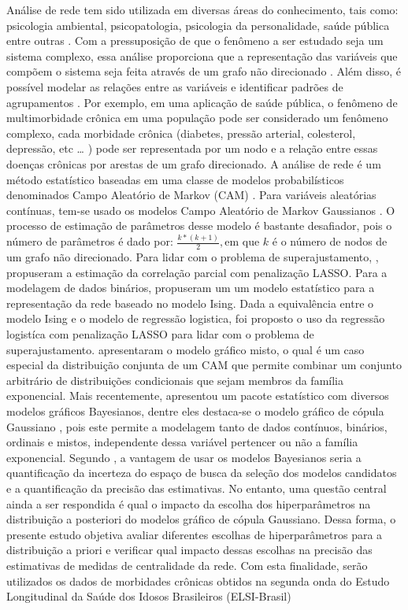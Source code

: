 \documentclass[
  super,
  preprint,
  3p]{elsarticle}
\begin{document}
Análise de rede tem sido utilizada em diversas áreas do conhecimento,
tais como: psicologia ambiental, psicopatologia, psicologia da
personalidade, saúde pública entre outras \citep[
]{ZWICKER2020101433, Borsboom2017, COSTANTINI201513, Soares2022}. Com a
pressuposição de que o fenômeno a ser estudado seja um sistema complexo,
essa análise proporciona que a representação das variáveis que compõem o
sistema seja feita através de um grafo não direcionado
\citep{Murphy2012}. Além disso, é possível modelar as relações entre as
variáveis e identificar padrões de agrupamentos \citep{Epskamp2022}. Por
exemplo, em uma aplicação de saúde pública, o fenômeno de multimorbidade
crônica em uma população pode ser considerado um fenômeno complexo, cada
morbidade crônica (diabetes, pressão arterial, colesterol, depressão,
etc \ldots{} ) pode ser representada por um nodo e a relação entre essas
doenças crônicas por arestas de um grafo direcionado. A análise de rede
é um método estatístico baseadas em uma classe de modelos
probabilísticos denominados Campo Aleatório de Markov (CAM)
\citep{Murphy2012}. Para variáveis aleatórias contínuas, tem-se usado os
modelos Campo Aleatório de Markov Gaussianos \citep{Rue2005}. O processo
de estimação de parâmetros desse modelo é bastante desafiador, pois o
número de parâmetros é dado por: \(\frac{k*(k+1)}{2},\)em que \(k\) é o
número de nodos de um grafo não direcionado. Para lidar com o problema
de superajustamento, \citet{Epskamp2018b}, propuseram a estimação da
correlação parcial com penalização LASSO. Para a modelagem de dados
binários, \citet{vanBorkulo2014} propuseram um um modelo estatístico
para a representação da rede baseado no modelo Ising. Dada a
equivalência entre o modelo Ising e o modelo de regressão logistica, foi
proposto o uso da regressão logistíca com penalização LASSO
\citep{Friedman2010} para lidar com o problema de superajustamento.
\citet{JSSv093i08} apresentaram o modelo gráfico misto, o qual é um caso
especial da distribuição conjunta de um CAM que permite combinar um
conjunto arbitrário de distribuições condicionais que sejam membros da
família exponencial. Mais recentemente, \citet{Huth} apresentou um
pacote estatístico com diversos modelos gráficos Bayesianos, dentre eles
destaca-se o modelo gráfico de cópula Gaussiano \citep{JSSv089i03}, pois
este permite a modelagem tanto de dados contínuos, binários, ordinais e
mistos, independente dessa variável pertencer ou não a família
exponencial. Segundo \citet{Huth}, a vantagem de usar os modelos
Bayesianos seria a quantificação da incerteza do espaço de busca da
seleção dos modelos candidatos e a quantificação da precisão das
estimativas. No entanto, uma questão central ainda a ser respondida é
qual o impacto da escolha dos hiperparâmetros na distribuição a
posteriori do modelos gráfico de cópula Gaussiano. Dessa forma, o
presente estudo objetiva avaliar diferentes escolhas de hiperparâmetros
para a distribuição a priori e verificar qual impacto dessas escolhas na
precisão das estimativas de medidas de centralidade da rede. Com esta
finalidade, serão utilizados os dados de morbidades crônicas obtidos na
segunda onda do Estudo Longitudinal da Saúde dos Idosos Brasileiros
(ELSI-Brasil) \citep{Lima-Costa2018}
\end{document}
